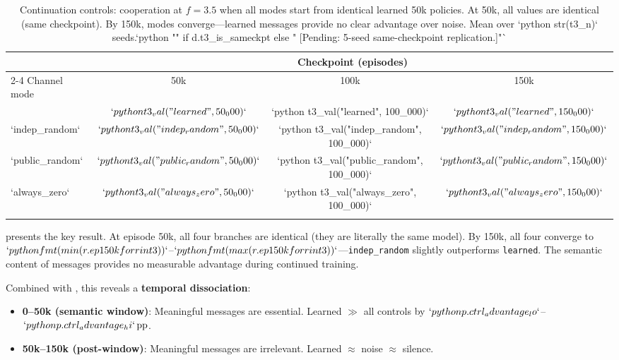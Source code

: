 \documentclass[
  10pt,
  letterpaper,
]{article}
\newcommand{\pp}{\text{\,pp}}
\begin{document}
\begin{table}[t]

\caption{Continuation controls: cooperation at $f\!=\!3.5$ when all modes start from identical learned 50k policies. At 50k, all values are identical (same checkpoint). By 150k, modes converge---learned messages provide no clear advantage over noise. Mean over `{python} str(t3_n)` seeds.`{python} "" if d.t3_is_sameckpt else " [Pending: 5-seed same-checkpoint replication.]"`}

  
  \centering
  \small
  \begin{tabular}{lccc}
    \toprule
    & \multicolumn{3}{c}{Checkpoint (episodes)} \\
    \cmidrule(lr){2-4}
    Channel mode & 50k & 100k & 150k \\
    \midrule

\begin{verbatim}
`learned`        & $`{python} t3_val("learned", 50_000)`$ & `{python} t3_val("learned", 100_000)` & $`{python} t3_val("learned", 150_000)`$ \\
`indep_random`  & $`{python} t3_val("indep_random", 50_000)`$ & `{python} t3_val("indep_random", 100_000)` & $`{python} t3_val("indep_random", 150_000)`$ \\
`public_random` & $`{python} t3_val("public_random", 50_000)`$ & `{python} t3_val("public_random", 100_000)` & $`{python} t3_val("public_random", 150_000)`$ \\
`always_zero`   & $`{python} t3_val("always_zero", 50_000)`$ & `{python} t3_val("always_zero", 100_000)` & $`{python} t3_val("always_zero", 150_000)`$ \\
\end{verbatim}

    \bottomrule
  \end{tabular}
\end{table}

\citet{tab:sameckpt} presents the key result. At episode 50k, all four
branches are identical (they are literally the same model). By 150k, all
four converge to
\(`{python} fmt(min(r.ep150k for r in t3))`\)--\(`{python} fmt(max(r.ep150k for r in t3))`\)---\texttt{indep\_random}
slightly outperforms \texttt{learned}. The semantic content of messages
provides no measurable advantage during continued training.

Combined with \citet{tab:separate_controls}, this reveals a
\textbf{temporal dissociation}:

\begin{itemize}[leftmargin=*,nosep]
  \item \textbf{0--50k (semantic window)}: Meaningful messages are essential. Learned $\gg$ all controls by $`{python} p.ctrl_advantage_lo`$--$`{python} p.ctrl_advantage_hi`\pp$.
  \item \textbf{50k--150k (post-window)}: Meaningful messages are irrelevant. Learned $\approx$ noise $\approx$ silence.
\end{itemize}
\end{document}
